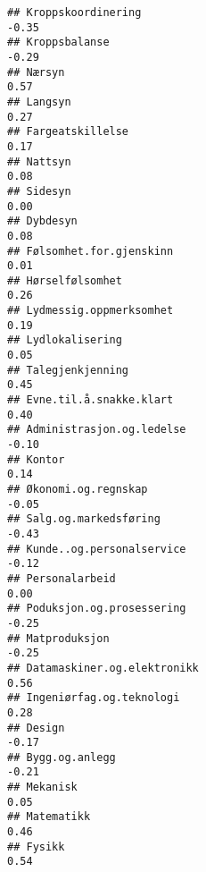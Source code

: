 \documentclass[
]{article}
\begin{document}
\begin{verbatim}
## Kroppskoordinering                                                               -0.35
## Kroppsbalanse                                                                    -0.29
## Nærsyn                                                                            0.57
## Langsyn                                                                           0.27
## Fargeatskillelse                                                                  0.17
## Nattsyn                                                                           0.08
## Sidesyn                                                                           0.00
## Dybdesyn                                                                          0.08
## Følsomhet.for.gjenskinn                                                           0.01
## Hørselfølsomhet                                                                   0.26
## Lydmessig.oppmerksomhet                                                           0.19
## Lydlokalisering                                                                   0.05
## Talegjenkjenning                                                                  0.45
## Evne.til.å.snakke.klart                                                           0.40
## Administrasjon.og.ledelse                                                        -0.10
## Kontor                                                                            0.14
## Økonomi.og.regnskap                                                              -0.05
## Salg.og.markedsføring                                                            -0.43
## Kunde..og.personalservice                                                        -0.12
## Personalarbeid                                                                    0.00
## Poduksjon.og.prosessering                                                        -0.25
## Matproduksjon                                                                    -0.25
## Datamaskiner.og.elektronikk                                                       0.56
## Ingeniørfag.og.teknologi                                                          0.28
## Design                                                                           -0.17
## Bygg.og.anlegg                                                                   -0.21
## Mekanisk                                                                          0.05
## Matematikk                                                                        0.46
## Fysikk                                                                            0.54

\end{verbatim}
\end{document}
